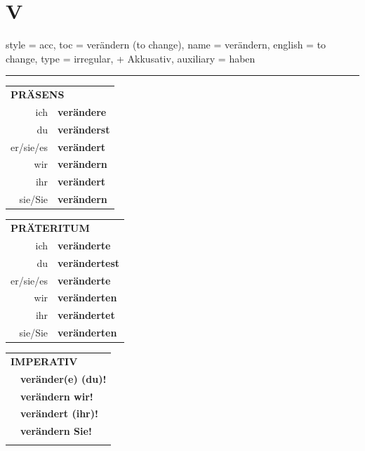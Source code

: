 \section{V}

\begin{verbentry}{
  style = {acc},
  toc = {verändern (to change)},
  name = {verändern},
  english = {to change},
  type = {irregular, + Akkusativ},
  auxiliary = {haben}
}
 
    
     \vspace{5pt}

    \hrule
    
    \vspace{5pt}

  \begin{tabular}{rl}
     \multicolumn{2}{l}{\textbf{PRÄSENS} }\\
    ich & \textbf{verändere}\\
    du & \textbf{veränderst}\\
    er/sie/es & \textbf{verändert}\\
    wir & \textbf{verändern}\\
    ihr & \textbf{verändert}\\
    sie/Sie & \textbf{verändern}\\
  \end{tabular}
  \hfill
     \begin{tabular}{rl}
    \multicolumn{2}{l}{\textbf{PRÄTERITUM} }\\
    ich & \textbf{veränderte}\\
    du & \textbf{verändertest}\\
    er/sie/es & \textbf{veränderte}\\
    wir & \textbf{veränderten}\\
    ihr & \textbf{verändertet}\\
    sie/Sie & \textbf{veränderten}\\
  \end{tabular}
  \hfill
  \begin{tabular}{rl}
     \multicolumn{2}{l}{\textbf{IMPERATIV} }\\
   & \textbf{veränder(e) (du)!}\\
   & \textbf{verändern wir!}\\
   & \textbf{verändert (ihr)!}\\
   & \textbf{verändern Sie!}\\
   & \vspace{10pt}
  \end{tabular}


\end{verbentry}
